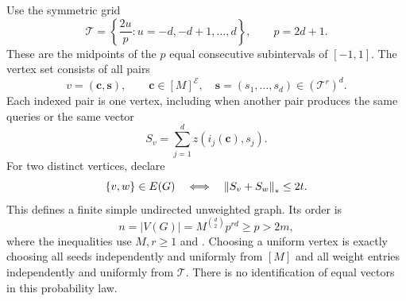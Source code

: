 Use the symmetric grid
\begin{equation}\label{graph:grid}
 \mathcal T=\left\{\frac{2u}{p}:u=-d,-d+1,\ldots,d\right\},
 \qquad p=2d+1.
\end{equation}
These are the midpoints of the $p$ equal consecutive subintervals of
$[-1,1]$.  The vertex set consists of all pairs
\[
 v=(\mathbf c,\mathbf s),\qquad
 \mathbf c\in[M]^{\mathcal E},\quad
 \mathbf s=(s_1,\ldots,s_d)\in(\mathcal T^r)^d.
\]
Each indexed pair is one vertex, including when another pair produces
the same queries or the same vector
\begin{equation}\label{graph:sum-vector}
 S_v=\sum_{j=1}^d z(i_j(\mathbf c),s_j).
\end{equation}
For two distinct vertices, declare
\begin{equation}\label{graph:edge}
 \{v,w\}\in E(G)
 \quad\Longleftrightarrow\quad
 \left\|S_v+S_w\right\|_*\leq2t.
\end{equation}
This defines a finite simple undirected unweighted graph.  Its order is
\begin{equation}\label{graph:size}
 n=|V(G)|=M^{\binom d2}p^{rd}\geq p>2m,
\end{equation}
where the inequalities use $M,r\geq1$ and
. Choosing a uniform vertex is exactly
choosing all seeds independently and uniformly from $[M]$ and all
weight entries independently and uniformly from $\mathcal T$.
There is no identification of equal vectors in this probability law.

